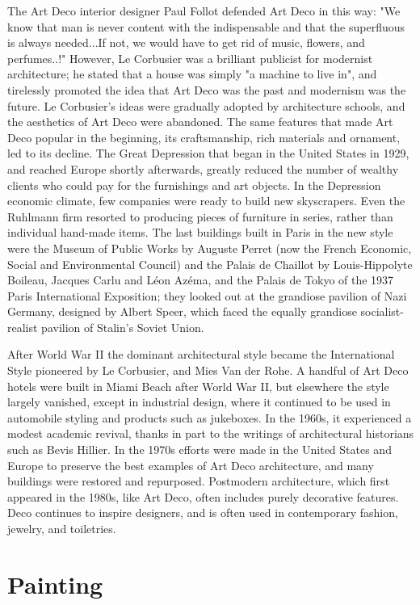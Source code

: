 The Art Deco interior designer Paul Follot defended Art Deco in this
way: "We know that man is never content with the indispensable and that
the superfluous is always needed...If not, we would have to get rid of
music, flowers, and perfumes..!" However, Le Corbusier was a brilliant
publicist for modernist architecture; he stated that a house was simply
"a machine to live in", and tirelessly promoted the idea that Art Deco
was the past and modernism was the future. Le Corbusier's ideas were
gradually adopted by architecture schools, and the aesthetics of Art
Deco were abandoned. The same features that made Art Deco popular in the
beginning, its craftsmanship, rich materials and ornament, led to its
decline. The Great Depression that began in the United States in 1929,
and reached Europe shortly afterwards, greatly reduced the number of
wealthy clients who could pay for the furnishings and art objects. In
the Depression economic climate, few companies were ready to build new
skyscrapers. Even the Ruhlmann firm resorted to producing pieces of
furniture in series, rather than individual hand-made items. The last
buildings built in Paris in the new style were the Museum of Public
Works by Auguste Perret (now the French Economic, Social and
Environmental Council) and the Palais de Chaillot by Louis-Hippolyte
Boileau, Jacques Carlu and Léon Azéma, and the Palais de Tokyo of the
1937 Paris International Exposition; they looked out at the grandiose
pavilion of Nazi Germany, designed by Albert Speer, which faced the
equally grandiose socialist-realist pavilion of Stalin's Soviet Union.

After World War II the dominant architectural style became the
International Style pioneered by Le Corbusier, and Mies Van der Rohe. A
handful of Art Deco hotels were built in Miami Beach after World War II,
but elsewhere the style largely vanished, except in industrial design,
where it continued to be used in automobile styling and products such as
jukeboxes. In the 1960s, it experienced a modest academic revival,
thanks in part to the writings of architectural historians such as Bevis
Hillier. In the 1970s efforts were made in the United States and Europe
to preserve the best examples of Art Deco architecture, and many
buildings were restored and repurposed. Postmodern architecture, which
first appeared in the 1980s, like Art Deco, often includes purely
decorative features. Deco continues to inspire designers, and is often
used in contemporary fashion, jewelry, and toiletries.

\section{Painting}\label{painting}

